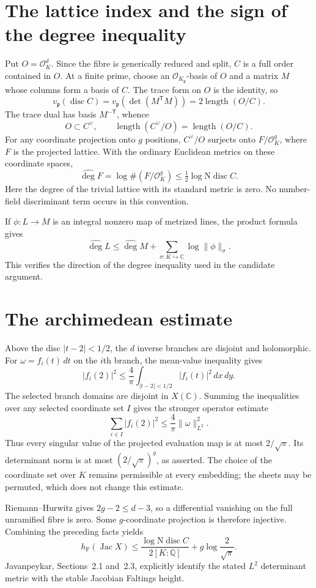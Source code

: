 \documentclass[11pt]{article}
\newcommand{\OK}{\mathcal O_K}
\newcommand{\Q}{\mathbb Q}
\newcommand{\hF}{h_{\mathrm F}}
\begin{document}
\section{The lattice index and the sign of the degree inequality}
Put $O=\OK^d$. Since the fibre is generically reduced and split,
$C$ is a full order contained in $O$. At a finite prime, choose
an $\OK_{\mathfrak p}$-basis of $O$ and a matrix $M$ whose columns
form a basis of $C$. The trace form on $O$ is the identity, so
\[
 v_{\mathfrak p}(\operatorname{disc}C)
 =v_{\mathfrak p}(\det(M^{\mathsf T}M))
 =2\operatorname{length}(O/C).
\]
The trace dual has basis $M^{-\mathsf T}$, whence
\[
 O\subset C^\vee,\qquad
 \operatorname{length}(C^\vee/O)=\operatorname{length}(O/C).
\]
For any coordinate projection onto $g$ positions,
$C^\vee/O$ surjects onto $F/\OK^g$, where $F$ is the projected
lattice. With the ordinary Euclidean metrics on these coordinate
spaces,
\[
 \widehat{\deg}F=\log\#(F/\OK^g)
 \le\tfrac12\log\mathrm N\operatorname{disc}C.
\]
Here the degree of the trivial lattice with its standard metric is
zero. No number-field discriminant term occurs in this convention.

If $\phi:L\to M$ is an integral nonzero map of metrized lines,
the product formula gives
\[
 \widehat{\deg}L\le\widehat{\deg}M+
 \sum_{\sigma:K\hookrightarrow\mathbb C}\log\|\phi\|_\sigma.
\]
This verifies the direction of the degree inequality used in the
candidate argument.

\section{The archimedean estimate}
Above the disc $|t-2|<1/2$, the $d$ inverse branches are disjoint
and holomorphic. For $\omega=f_i(t)\,dt$ on the $i$th branch,
the mean-value inequality gives
\[
 |f_i(2)|^2\le\frac4\pi\int_{|t-2|<1/2}|f_i(t)|^2\,dx\,dy.
\]
The selected branch domains are disjoint in $X(\mathbb C)$.
Summing the inequalities over any selected coordinate set $I$ gives
the stronger operator estimate
\[
 \sum_{i\in I}|f_i(2)|^2\le\frac4\pi\|\omega\|_{L^2}^2.
\]
Thus every singular value of the projected evaluation map is at
most $2/\sqrt\pi$. Its determinant norm is at most
$(2/\sqrt\pi)^g$, as asserted. The choice of the coordinate set
over $K$ remains permissible at every embedding; the sheets may be
permuted, which does not change this estimate.

Riemann--Hurwitz gives $2g-2\le d-3$, so a differential vanishing
on the full unramified fibre is zero. Some $g$-coordinate projection
is therefore injective. Combining the preceding facts yields
\[
 \hF(\operatorname{Jac}X)\le
 \frac{\log\mathrm N\operatorname{disc}C}{2[K:\Q]}
 +g\log\frac2{\sqrt\pi}.
\]
Javanpeykar, Sections~2.1 and~2.3, explicitly identify the stated
$L^2$ determinant metric with the stable Jacobian Faltings height.
\end{document}
